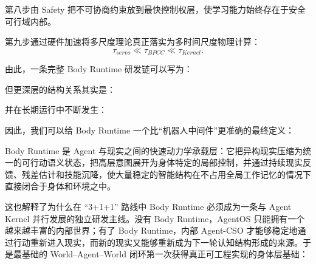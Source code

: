 第八步由 Safety 把不可协商约束放到最快控制权层，使学习能力始终存在于安全可行域内部。

第九步通过硬件加速将多尺度理论真正落实为多时间尺度物理计算：
\[
\tau_{servo}
\ll
\tau_{BPCC}
\ll
\tau_{Kernel}.
\]

由此，一条完整 Body Runtime 研发链可以写为：
\begin{statementbox}
\centering
{}
\end{statementbox}

但更深层的结构关系其实是：
\begin{statementbox}
\centering
{}
\end{statementbox}
并在长期运行中不断发生：
\begin{statementbox}
\centering
{}
\end{statementbox}

因此，我们可以给 Body Runtime 一个比“机器人中间件”更准确的最终定义：
\begin{definition*}
Body Runtime 是 Agent 与现实之间的快速动力学承载层：它把异构现实压缩为统一的可行动语义状态，把高层意图展开为身体特定的局部控制，并通过持续现实反馈、残差估计和技能沉降，使大量稳定的智能结构在不占用全局工作记忆的情况下直接闭合于身体和环境之中。
\end{definition*}

这也解释了为什么在 ``3+1+1'' 路线中 Body Runtime 必须成为一条与 Agent Kernel 并行发展的独立研发主线。没有 Body Runtime，AgentOS 只能拥有一个越来越丰富的内部世界；有了 Body Runtime，内部 Agent-CSO 才能够稳定地通过行动重新进入现实，而新的现实又能够重新成为下一轮认知结构形成的来源。于是最基础的 World--Agent--World 闭环第一次获得真正可工程实现的身体层基础：
\begin{statementbox}
\centering
{}
\end{statementbox}
